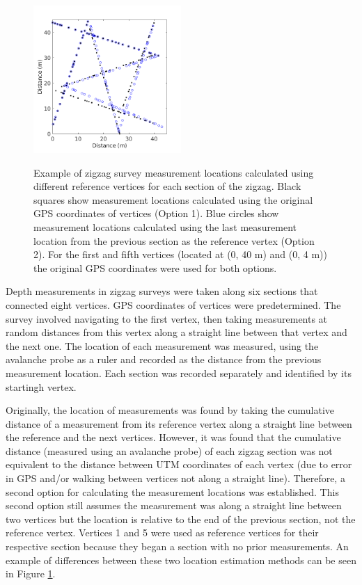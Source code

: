 \documentclass{sfuthesis}
\begin{document}
\begin{figure}
	\centering
	\includegraphics[width = 0.5\textwidth]{Zigzag_calOptions.png}\\
	\caption[Example of zigzag survey measurement locations calculated using different reference vertices for each section of the zigzag]{Example of zigzag survey measurement locations calculated using different reference vertices for each section of the zigzag. Black squares show measurement locations calculated using the original GPS coordinates of vertices (Option 1). Blue circles show measurement locations calculated using the last measurement location from the previous section as the reference vertex (Option 2). For the first and fifth vertices (located at (0, 40 m) and (0, 4 m)) the original GPS coordinates were used for both options. }
	\label{fig:zigzag_location_options}
\end{figure}

Depth measurements in zigzag surveys were taken along six sections that connected eight vertices. GPS coordinates of vertices were predetermined. The survey involved navigating to the first vertex, then taking measurements at random distances from this vertex along a straight line between that vertex and the next one. The location of each measurement was measured, using the avalanche probe as a ruler and recorded as the distance from the previous measurement location. Each section was recorded separately and identified by its startingh vertex. 

Originally, the location of measurements was found by taking the cumulative distance of a measurement from its reference vertex along a straight line between the reference and the next vertices. However, it was found that the cumulative distance (measured using an avalanche probe) of each zigzag section was not equivalent to the distance between UTM coordinates of each vertex (due to error in GPS and/or walking between vertices not along a straight line). Therefore, a second option for calculating the measurement locations was established. This second option still assumes the measurement was along a straight line between two vertices but the location is relative to the end of the previous section, not the reference vertex. Vertices 1 and 5 were used as reference vertices for their respective section because they began a section with no prior measurements. An example of differences between these two location estimation methods can be seen in Figure \ref{fig:zigzag_location_options}.
\end{document}
